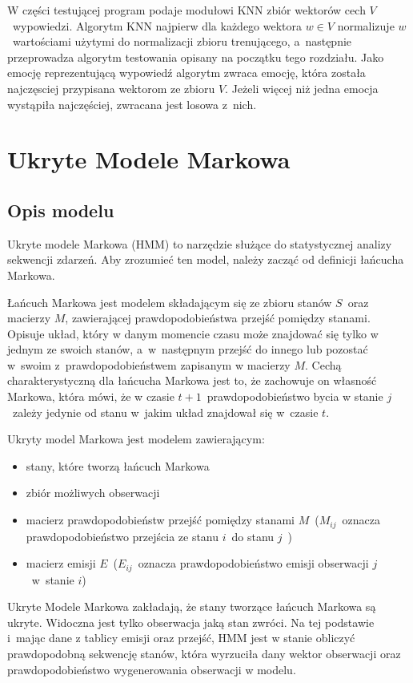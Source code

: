 \documentclass[declaration,shortabstract]{iithesis}
\begin{document}
W części testującej program podaje modułowi KNN zbiór wektorów cech $V$~wypowiedzi. Algorytm KNN najpierw dla każdego wektora $w \in V$ normalizuje $w$~wartościami użytymi do normalizacji zbioru trenującego, a~następnie przeprowadza algorytm testowania opisany na początku tego rozdziału. Jako emocję reprezentującą wypowiedź algorytm zwraca emocję, która została najczęsciej przypisana wektorom ze zbioru $V$. Jeżeli więcej niż jedna emocja wystąpiła najczęściej, zwracana jest losowa z~nich.  

\chapter{Ukryte Modele Markowa}
\section{Opis modelu}
Ukryte modele Markowa (HMM) to narzędzie służące do statystycznej analizy sekwencji zdarzeń. Aby zrozumieć ten model, należy zacząć od 
definicji łańcucha Markowa.

Łańcuch Markowa jest modelem składającym się ze zbioru stanów $S$~oraz macierzy $M$, zawierającej prawdopodobieństwa przejść pomiędzy stanami. Opisuje układ, który w danym momencie czasu może znajdować się tylko w jednym ze swoich stanów, a~w~następnym przejść do innego lub pozostać w~swoim z~prawdopodobieństwem zapisanym w macierzy $M$. Cechą charakterystyczną dla łańcucha Markowa jest to, że zachowuje on własność Markowa, która mówi, że w czasie $t+1$~prawdopodobieństwo bycia w stanie $j$~zależy jedynie od stanu w~jakim układ znajdował się w~czasie $t$.

Ukryty model Markowa jest modelem zawierającym:
\begin{itemize}
\item stany, które tworzą łańcuch Markowa
\item zbiór możliwych obserwacji
\item macierz prawdopodobieństw przejść pomiędzy stanami $M$~($M_{ij}$~oznacza prawdopodobieństwo przejścia ze stanu $i$~do stanu $j$~)
\item macierz emisji $E$~($E_{ij}$~oznacza prawdopodobieństwo emisji obserwacji $j$~w~stanie $i$)
\end{itemize}

Ukryte Modele Markowa zakładają, że stany tworzące łańcuch Markowa są ukryte. Widoczna jest tylko obserwacja jaką stan zwróci. Na tej podstawie i~mając dane z tablicy emisji oraz przejść, HMM jest w stanie obliczyć prawdopodobną sekwencję stanów, która wyrzuciła dany wektor obserwacji oraz prawdopodobieństwo wygenerowania obserwacji w modelu.
\end{document}
